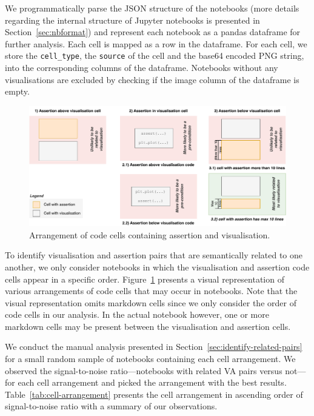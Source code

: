 \documentclass[conference]{IEEEtran}
\begin{document}
We programmatically parse the JSON structure of the notebooks (more details regarding the internal structure of Jupyter notebooks is presented in Section~\ref{sec:nbformat}) and represent each notebook as a pandas dataframe for further analysis. Each cell is mapped as a row in the dataframe. For each cell, we store the \texttt{cell\_type}, the \texttt{source} of the cell and the base64 encoded PNG string, into the corresponding columns of the dataframe. Notebooks without any visualisations are excluded by checking if the image column of  the dataframe is empty.

\begin{figure}
  \centering
  \includegraphics[width=\linewidth]{nb-structure.pdf}
  \caption{Arrangement of code cells containing assertion and
    visualisation.}\label{fig:cell-arrangement}
\end{figure}

To identify visualisation and assertion pairs that are semantically related to one another, we only consider notebooks in which the visualisation and assertion code cells appear in a specific order. Figure~\ref{fig:cell-arrangement} presents a visual representation of various arrangements of code cells that may occur in notebooks. Note that the visual representation omits markdown cells since we only consider the order of code cells in our analysis. In the actual notebook however, one or more markdown cells may be present between the visualisation and assertion cells.

We conduct the manual analysis presented in Section~\ref{sec:identify-related-pairs} for a small random sample of notebooks containing each cell arrangement. We observed the signal-to-noise ratio---notebooks with related VA pairs versus not---for each cell arrangement and picked the arrangement with the best results. Table~\ref{tab:cell-arrangement} presents the cell arrangement in ascending order of signal-to-noise ratio with a summary of our observations.
\end{document}
